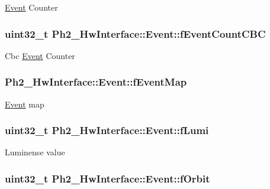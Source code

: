\hyperlink{class_ph2___hw_interface_1_1_event}{Event} Counter \hypertarget{class_ph2___hw_interface_1_1_event_ac61b0e2c53e5d4228d43132f470dfdac}{
\subsubsection[{f\-Event\-Count\-C\-B\-C}]{\setlength{\rightskip}{0pt plus 5cm}uint32\-\_\-t Ph2\-\_\-\-Hw\-Interface\-::\-Event\-::f\-Event\-Count\-C\-B\-C\hspace{0.3cm}{\ttfamily [private]}}}\label{class_ph2___hw_interface_1_1_event_ac61b0e2c53e5d4228d43132f470dfdac}
Cbc \hyperlink{class_ph2___hw_interface_1_1_event}{Event} Counter \hypertarget{class_ph2___hw_interface_1_1_event_ace9844f1fc14895f880ed111c705d392}{
\subsubsection[{f\-Event\-Map}]{ Ph2\-\_\-\-Hw\-Interface\-::\-Event\-::f\-Event\-Map\hspace{0.3cm}{\ttfamily [private]}}}\label{class_ph2___hw_interface_1_1_event_ace9844f1fc14895f880ed111c705d392}
\hyperlink{class_ph2___hw_interface_1_1_event}{Event} map \hypertarget{class_ph2___hw_interface_1_1_event_a78afd0886560acf70ee6b982c5690e0a}{
\subsubsection[{f\-Lumi}]{\setlength{\rightskip}{0pt plus 5cm}uint32\-\_\-t Ph2\-\_\-\-Hw\-Interface\-::\-Event\-::f\-Lumi\hspace{0.3cm}{\ttfamily [private]}}}\label{class_ph2___hw_interface_1_1_event_a78afd0886560acf70ee6b982c5690e0a}
Luminense value \hypertarget{class_ph2___hw_interface_1_1_event_a6aa6c402d2b16e735fbb4b7518c2666e}{
\subsubsection[{f\-Orbit}]{\setlength{\rightskip}{0pt plus 5cm}uint32\-\_\-t Ph2\-\_\-\-Hw\-Interface\-::\-Event\-::f\-Orbit\hspace{0.3cm}{\ttfamily [private]}}}\label{class_ph2___hw_interface_1_1_event_a6aa6c402d2b16e735fbb4b7518c2666e}
